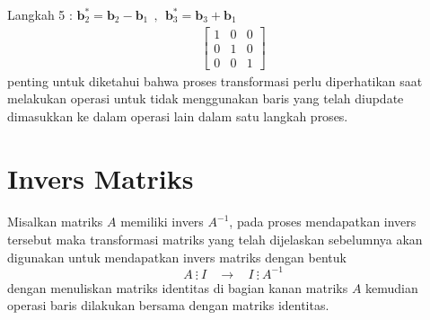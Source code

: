 \documentclass{article}   %
\begin{document}
Langkah 5 : $\textbf{b}^*_2= \textbf{b}_2 - \textbf{b}_1~~,~~\textbf{b}^*_3= \textbf{b}_3 + \textbf{b}_1$ \\
\begin{align*}
	\left[
	\begin{array}{rrr} 
		1 & 0 & 0\\
		0 & 1 & 0\\
		0 &0 & 1 
	\end{array} 
	\right]
\end{align*}
penting untuk diketahui bahwa proses transformasi perlu diperhatikan saat melakukan operasi untuk tidak menggunakan baris yang telah diupdate dimasukkan ke dalam operasi lain dalam satu langkah proses.
		\section{Invers Matriks}
		\paragraph*{} Misalkan matriks $A$ memiliki invers $A^{-1}$, pada proses mendapatkan invers tersebut maka transformasi matriks yang telah dijelaskan sebelumnya akan digunakan untuk mendapatkan invers matriks dengan bentuk 
		$$A~ \vdots~  I~~~~ \longrightarrow ~~~~I ~\vdots~ A^{-1}$$
		dengan menuliskan matriks identitas di bagian kanan matriks $A$ kemudian operasi baris dilakukan bersama dengan matriks identitas.
\end{document}
